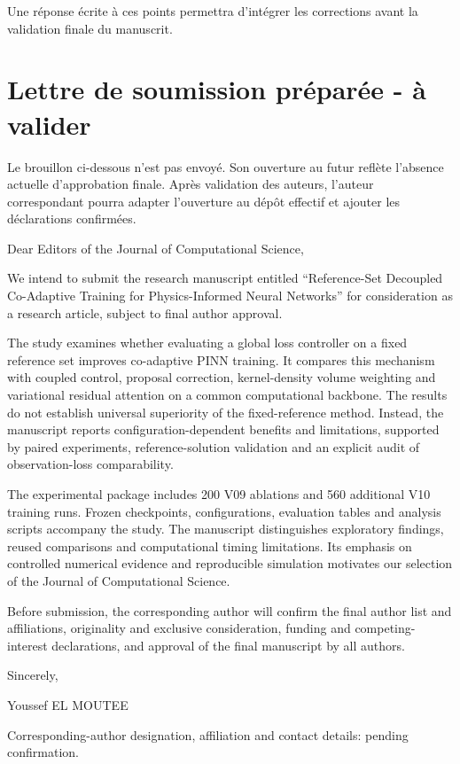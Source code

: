 \documentclass[
  11pt,
]{article}
\begin{document}
Une réponse écrite à ces points permettra d'intégrer les corrections
avant la validation finale du manuscrit.

\hypertarget{lettre-de-soumission-pruxe9paruxe9e---uxe0-valider}{%
\section{Lettre de soumission préparée - à
valider}\label{lettre-de-soumission-pruxe9paruxe9e---uxe0-valider}}

Le brouillon ci-dessous n'est pas envoyé. Son ouverture au futur reflète
l'absence actuelle d'approbation finale. Après validation des auteurs,
l'auteur correspondant pourra adapter l'ouverture au dépôt effectif et
ajouter les déclarations confirmées.

Dear Editors of the Journal of Computational Science,

We intend to submit the research manuscript entitled ``Reference-Set
Decoupled Co-Adaptive Training for Physics-Informed Neural Networks''
for consideration as a research article, subject to final author
approval.

The study examines whether evaluating a global loss controller on a
fixed reference set improves co-adaptive PINN training. It compares this
mechanism with coupled control, proposal correction, kernel-density
volume weighting and variational residual attention on a common
computational backbone. The results do not establish universal
superiority of the fixed-reference method. Instead, the manuscript
reports configuration-dependent benefits and limitations, supported by
paired experiments, reference-solution validation and an explicit audit
of observation-loss comparability.

The experimental package includes 200 V09 ablations and 560 additional
V10 training runs. Frozen checkpoints, configurations, evaluation tables
and analysis scripts accompany the study. The manuscript distinguishes
exploratory findings, reused comparisons and computational timing
limitations. Its emphasis on controlled numerical evidence and
reproducible simulation motivates our selection of the Journal of
Computational Science.

Before submission, the corresponding author will confirm the final
author list and affiliations, originality and exclusive consideration,
funding and competing-interest declarations, and approval of the final
manuscript by all authors.

Sincerely,

Youssef EL MOUTEE

Corresponding-author designation, affiliation and contact details:
pending confirmation.
\end{document}
